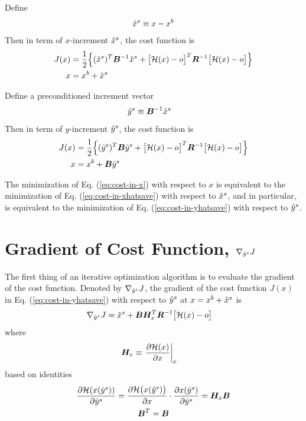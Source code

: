 \documentclass{article}
\begin{document}
Define
\begin{gather}
\label{eq:xhatsave}
{{\hat{x}}^s} \equiv x - x^b
\end{gather}
Then in term of $x$-increment ${{\hat{x}}^s}$,
the cost function is
\begin{subequations}
\begin{align}
\label{eq:cost-in-xhatsave}
J(x) &= {\frac{1}{2}}
  \Bigl\{
	({{\hat{x}}^s})^T
	\bm B^{-1}
	{{\hat{x}}^s}
	+
	\bigl[ {\mathcal H}(x) - o \bigr]^T
	\bm R^{-1}
	\bigl[ {\mathcal H}(x) - o \bigr]
  \Bigr\}		\\
\label{eq:x-in-xhatsave}
x &= x^b + {{\hat{x}}^s}
\end{align}
\end{subequations}

Define a preconditioned increment vector
\begin{align}
  {{\hat{y}}^s} &\equiv \bm B^{-1}{{\hat{x}}^s}
\end{align}
Then in term of $y$-increment ${{\hat{y}}^s}$, the cost function is
\begin{subequations}
\begin{align}
\label{eq:cost-in-yhatsave}
J(x) &= {\frac{1}{2}}
  \Bigl\{
	({{\hat{y}}^s})^T
	\bm B
	{{\hat{y}}^s}
	+
	\bigl[ {\mathcal H}(x) - o \bigr]^T
	\bm R^{-1}
	\bigl[ {\mathcal H}(x) - o \bigr]
  \Bigr\}
  \\
\label{eq:x-in-yhatsave}
x &= x^b + \bm B {{\hat{y}}^s}
\end{align}
\end{subequations}

The minimization of Eq. (\ref{eq:cost-in-x}) with respect to
$x$ is equivalent to
the minimization of Eq. (\ref{eq:cost-in-xhatsave}) with respect to
${{\hat{x}}^s}$, and in particular, is equivalent to
the minimization of Eq. (\ref{eq:cost-in-yhatsave}) with respect to
${{\hat{y}}^s}$.

\section{Gradient of Cost Function, $\nabla_{{\hat{y}}^s} J$}

The first thing of an iterative optimization algorithm is
to evaluate the gradient of the cost function.
Denoted by $\nabla_{{\hat{y}}^s} J$, the
gradient of the cost function $J(x)$ in Eq. (\ref{eq:cost-in-yhatsave})
with respect to ${{\hat{y}}^s}$ at $x=x^b+{{\hat{x}}^s}$ is
\begin{align}
\label{eq:grad-in-yhatsave}
  \nabla_{{\hat{y}}^s} J
    &=	{{\hat{x}}^s} +
	\bm B\bm H_x^T \bm R^{-1}
	\bigl[ {\mathcal H}(x) - o \bigr]
\end{align}
where
\begin{align*}
  \bm H_x &\equiv \left. \frac{\partial {\mathcal H}(x)}{\partial x}
  		\right|_{x}
\end{align*}
based on identities
\begin{gather*}
  \frac{\partial {\mathcal H}(x({{\hat{y}}^s}))}{\partial {{\hat{y}}^s}}
    =	\frac{\partial {\mathcal H}\bigl(x({{\hat{y}}^s})\bigr)}{\partial x}	\cdot
	\frac{\partial          x({{\hat{y}}^s})      }{\partial {{\hat{y}}^s}}
    =	\bm H_x \bm B	\\
  \bm B^T = \bm B
\end{gather*}
\end{document}
